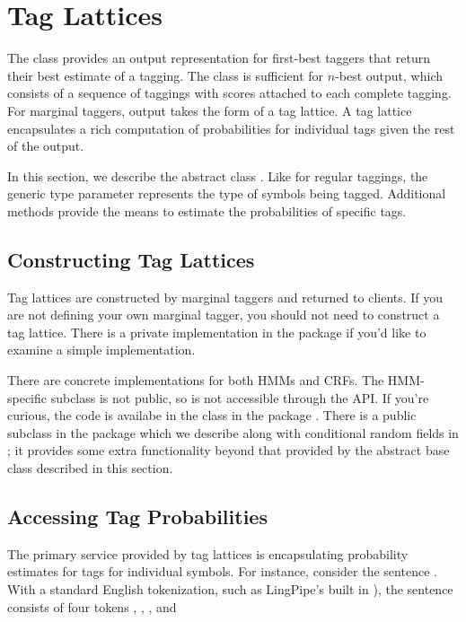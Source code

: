 \section{Tag Lattices}

The  class provides an output representation for
first-best taggers that return their best estimate of a tagging.  The
 class is sufficient for $n$-best output, which
consists of a sequence of taggings with scores attached to each
complete tagging.  For marginal taggers, output takes the form of a
tag lattice.  A tag lattice encapsulates a rich computation of
probabilities for individual tags given the rest of the output.

In this section, we describe the abstract class .
Like for regular taggings, the generic type parameter 
represents the type of symbols being tagged.  Additional methods
provide the means to estimate the probabilities of specific tags.

\subsection{Constructing Tag Lattices}

Tag lattices are constructed by marginal taggers and returned to
clients.  If you are not defining your own marginal tagger, you should
not need to construct a tag lattice.  There is a private
implementation in the  package if you'd like to examine a
simple implementation.  

There are concrete implementations for both HMMs and CRFs.  The
HMM-specific subclass is not public, so is not accessible through the
API.  If you're curious, the code is availabe in the class
 in the package .  There is
a public subclass  in the 
package which we describe along with conditional random fields in
; it provides some extra functionality beyond that provided
by the abstract base class described in this section.

\subsection{Accessing Tag Probabilities}

The primary service provided by tag lattices is encapsulating
probability estimates for tags for individual symbols.  For instance,
consider the sentence .  With a
standard English tokenization, such as LingPipe's built in
), the sentence consists of four
tokens , ,
, and   

